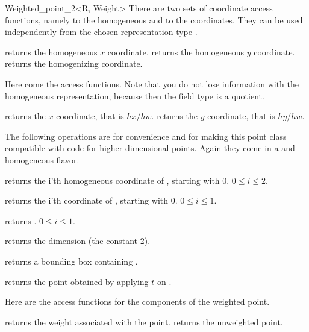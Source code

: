 \begin{ccRefClass} {Weighted_point_2<R, Weight>}
There are two sets of coordinate access functions, namely to the
homogeneous and to the  coordinates. They can be used
independently from the chosen representation type .

       {returns the homogeneous $x$ coordinate.}
\ccGlue
{}
       {returns the homogeneous $y$ coordinate.}
\ccGlue
{}
       {returns the homogenizing  coordinate.}

Here come the  access functions. Note that you do 
not lose information with the homogeneous representation, because then the field
type is a quotient.

    {returns the  $x$ coordinate, that is $hx/hw$.}
\ccGlue
{}
    {returns the  $y$ coordinate, that is $hy/hw$.}


The following operations are for convenience and for making this
point class compatible with code for higher dimensional points.
Again they come in a  and homogeneous flavor.

       {returns the i'th homogeneous coordinate of \ccVar, starting with 0.
        \ccPrecond $0\leq i \leq 2$.}

       {returns the i'th  coordinate of \ccVar, 
        starting with 0.
        \ccPrecond $0\leq i \leq 1$.}

       {returns .
        \ccPrecond $0\leq i \leq 1$.}

       {returns the dimension (the constant 2).}

       {returns a bounding box containing \ccVar.}

       {returns the point obtained by applying $t$ on \ccVar.}

Here are the access functions for the components of the weighted point.

       {returns the weight associated with the point.}
\ccGlue
{}
       {returns the unweighted point.}




\end{ccRefClass}
